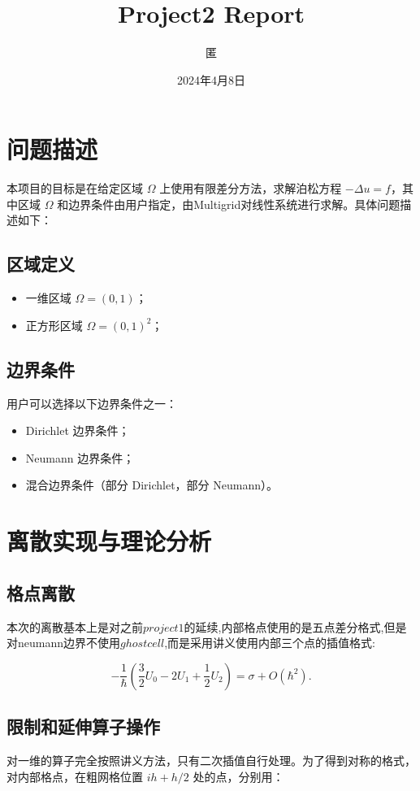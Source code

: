\documentclass[a4paper]{ctexart} %
\title{Project2 Report}
\author{匿}
\date{2024年4月8日}
\newcommand{\laplace}{\ensuremath{\Delta}}
\begin{document}
\maketitle

\pagestyle{empty}

\section{问题描述}
本项目的目标是在给定区域 $\Omega$ 上使用有限差分方法，求解泊松方程 $-\laplace u = f$，其中区域 $\Omega$ 和边界条件由用户指定，由Multigrid对线性系统进行求解。具体问题描述如下：

\subsection{区域定义}
\begin{itemize}
    \item[(a)] 一维区域 $\Omega = (0, 1)$；
    \item[(b)] 正方形区域 $\Omega = (0, 1)^2$；
\end{itemize}

\subsection{边界条件}
用户可以选择以下边界条件之一：
\begin{itemize}
    \item Dirichlet 边界条件；
    \item Neumann 边界条件；
    \item 混合边界条件（部分 Dirichlet，部分 Neumann）。
\end{itemize}

\section{离散实现与理论分析}
\subsection{格点离散}
本次的离散基本上是对之前$project1$的延续,内部格点使用的是五点差分格式,但是对neumann边界不使用$ghost cell$,而是采用讲义使用内部三个点的插值格式:

\[-\frac{1}{\hbar}\left(\frac{3}{2}U_{0}-2U_{1}+\frac{1}{2}U_{2}\right)=\sigma+O(\hbar^{2}).\] 
\subsection{限制和延伸算子操作}
对一维的算子完全按照讲义方法，只有二次插值自行处理。为了得到对称的格式，对内部格点，在粗网格位置 $ih + h/2$ 处的点，分别用：
\end{document}

